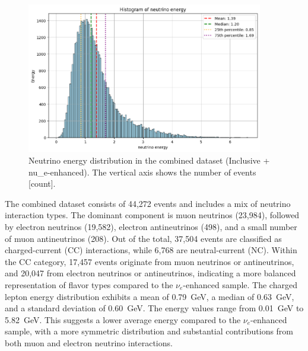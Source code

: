 \documentclass{pracalicmgr}
\begin{document}
\begin{figure}[h]
    \includegraphics[width=0.92\textwidth]{src/neutrinoFull.png}
    \caption{Neutrino energy distribution in the combined dataset (Inclusive + nu\_e-enhanced). The vertical axis shows the number of events [count].}
    \label{fig:neutrino-combined}
\end{figure}

The combined dataset consists of 44,272 events and includes a mix of neutrino interaction types. The dominant component is muon neutrinos (23,984), followed by electron neutrinos (19,582), electron antineutrinos (498), and a small number of muon antineutrinos (208). Out of the total, 37,504 events are classified as charged-current (CC) interactions, while 6,768 are neutral-current (NC). Within the CC category, 17,457 events originate from muon neutrinos or antineutrinos, and 20,047 from electron neutrinos or antineutrinos, indicating a more balanced representation of flavor types compared to the $\nu_e$-enhanced sample. The charged lepton energy distribution exhibits a mean of 0.79~GeV, a median of 0.63~GeV, and a standard deviation of 0.60~GeV. The energy values range from 0.01~GeV to 5.82~GeV. This suggests a lower average energy compared to the $\nu_e$-enhanced sample, with a more symmetric distribution and substantial contributions from both muon and electron neutrino interactions.
\end{document}
